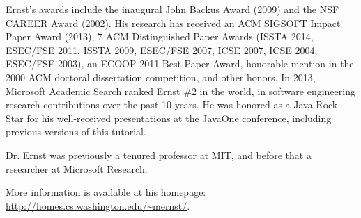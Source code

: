 \documentclass{llncs} %
\begin{document}
Ernst's awards include the inaugural John Backus Award (2009) and the NSF
CAREER Award (2002). His research has received an ACM SIGSOFT Impact Paper
Award (2013), 7 ACM Distinguished Paper Awards (ISSTA 2014, ESEC/FSE 2011,
ISSTA 2009, ESEC/FSE 2007, ICSE 2007, ICSE 2004, ESEC/FSE 2003), an ECOOP
2011 Best Paper Award, honorable mention in the 2000 ACM doctoral
dissertation competition, and other honors. In 2013, Microsoft Academic
Search ranked Ernst \#2 in the world, in software engineering research
contributions over the past 10 years.  He was honored as a Java Rock Star
for his well-received presentations at the JavaOne conference, including
previous versions of this tutorial.

Dr. Ernst was previously a tenured professor at MIT, and before that a researcher at Microsoft Research.

More information is available at his homepage: \url{http://homes.cs.washington.edu/~mernst/}.
\end{document}
